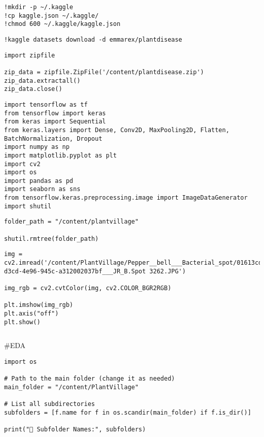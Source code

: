 \documentclass{article}
\begin{document}
\begin{lstlisting}
!mkdir -p ~/.kaggle
!cp kaggle.json ~/.kaggle/
!chmod 600 ~/.kaggle/kaggle.json
\end{lstlisting}
\begin{lstlisting}
!kaggle datasets download -d emmarex/plantdisease
\end{lstlisting}
\begin{lstlisting}
import zipfile

zip_data = zipfile.ZipFile('/content/plantdisease.zip')
zip_data.extractall()
zip_data.close()
\end{lstlisting}
\begin{lstlisting}
import tensorflow as tf
from tensorflow import keras
from keras import Sequential
from keras.layers import Dense, Conv2D, MaxPooling2D, Flatten, BatchNormalization, Dropout
import numpy as np
import matplotlib.pyplot as plt
import cv2
import os
import pandas as pd
import seaborn as sns
from tensorflow.keras.preprocessing.image import ImageDataGenerator
import shutil
\end{lstlisting}
\begin{lstlisting}
folder_path = "/content/plantvillage"

shutil.rmtree(folder_path)
\end{lstlisting}
\begin{lstlisting}
img = cv2.imread('/content/PlantVillage/Pepper__bell___Bacterial_spot/01613cd0-d3cd-4e96-945c-a312002037bf___JR_B.Spot 3262.JPG')

img_rgb = cv2.cvtColor(img, cv2.COLOR_BGR2RGB)

plt.imshow(img_rgb)
plt.axis("off")
plt.show()
\end{lstlisting}
\begin{lstlisting}

\end{lstlisting}
#EDA
\begin{lstlisting}
import os

# Path to the main folder (change it as needed)
main_folder = "/content/PlantVillage"

# List all subdirectories
subfolders = [f.name for f in os.scandir(main_folder) if f.is_dir()]

print("📂 Subfolder Names:", subfolders)
\end{lstlisting}
\end{document}
